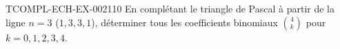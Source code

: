 \begin{exercice}{TCOMPL-ECH-EX-002}{1}{10}
En complétant le triangle de Pascal à partir de la ligne $n=3$ ($1,3,3,1$), déterminer tous les coefficients binomiaux $\binom{4}{k}$ pour $k=0,1,2,3,4$.
\end{exercice}
